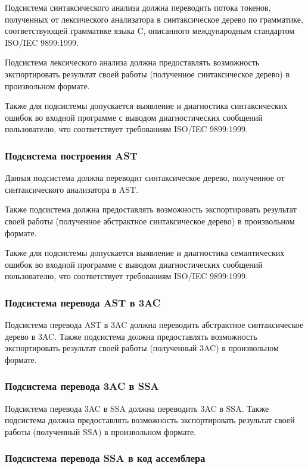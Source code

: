 \documentclass[14pt,russian]{extarticle}
\begin{document}
Подсистема синтаксического анализа должна переводить потока токенов, полученных
от лексического анализатора в синтаксическое дерево по грамматике,
соответствующей грамматике языка C, описанного международным стандартом ISO/IEC
9899:1999.

Подсистема лексического анализа должна предоставлять возможность экспортировать
результат своей работы (полученное синтаксическое дерево) в произвольном
формате.

Также для подсистемы допускается выявление и диагностика синтаксических ошибок
во входной программе с выводом диагностических сообщений пользователю, что
соответствует требованиям ISO/IEC 9899:1999.

\subsubsection{Подсистема построения AST}

Данная подсистема должна переводит синтаксическое дерево, полученное от
синтаксического анализатора в AST.

Также подсистема должна предоставлять возможность экспортировать результат своей
работы (полученное абстрактное синтаксическое дерево) в произвольном формате.

Также для подсистемы допускается выявление и диагностика семантических ошибок во
входной программе с выводом диагностических сообщений пользователю, что
соответствует требованиям ISO/IEC 9899:1999.

\subsubsection{Подсистема перевода AST в 3AC}

Подсистема перевода AST в 3AC должна переводить абстрактное синтаксическое
дерево в 3AC. Также подсистема должна предоставлять возможность экспортировать
результат своей работы (полученный 3AC) в произвольном формате.

\subsubsection{Подсистема перевода 3AC в SSA}

Подсистема перевода 3AC в SSA должна переводить 3AC в SSA. Также подсистема
должна предоставлять возможность экспортировать результат своей работы
(полученный SSA) в произвольном формате.

\subsubsection{Подсистема перевода SSA в код ассемблера}
\end{document}
